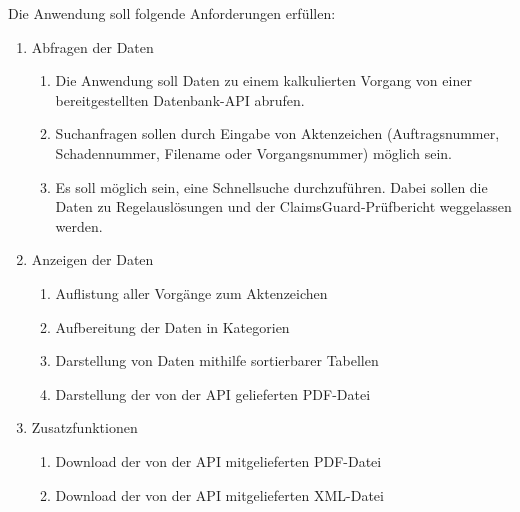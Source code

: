 Die Anwendung soll folgende Anforderungen erfüllen:
\begin{enumerate}
    \item Abfragen der Daten
        \begin{enumerate}
            \item Die Anwendung soll Daten zu einem kalkulierten Vorgang von einer bereitgestellten Datenbank-API abrufen.
            \item Suchanfragen sollen durch Eingabe von Aktenzeichen (Auftragsnummer, Schadennummer, Filename oder Vorgangsnummer) 
            möglich sein.
            \item Es soll möglich sein, eine Schnellsuche durchzuführen. Dabei sollen die Daten zu Regelauslösungen und der
            ClaimsGuard-Prüfbericht weggelassen werden.            
        \end{enumerate}
    \item Anzeigen der Daten
        \begin{enumerate}
            \item Auflistung aller Vorgänge zum Aktenzeichen
            \item Aufbereitung der Daten in Kategorien
            \item Darstellung von Daten mithilfe sortierbarer Tabellen
            \item Darstellung der von der API gelieferten PDF-Datei
        \end{enumerate}
    \item Zusatzfunktionen
        \begin{enumerate}
            \item Download der von der API mitgelieferten PDF-Datei
            \item Download der von der API mitgelieferten XML-Datei
        \end{enumerate}
\end{enumerate}
